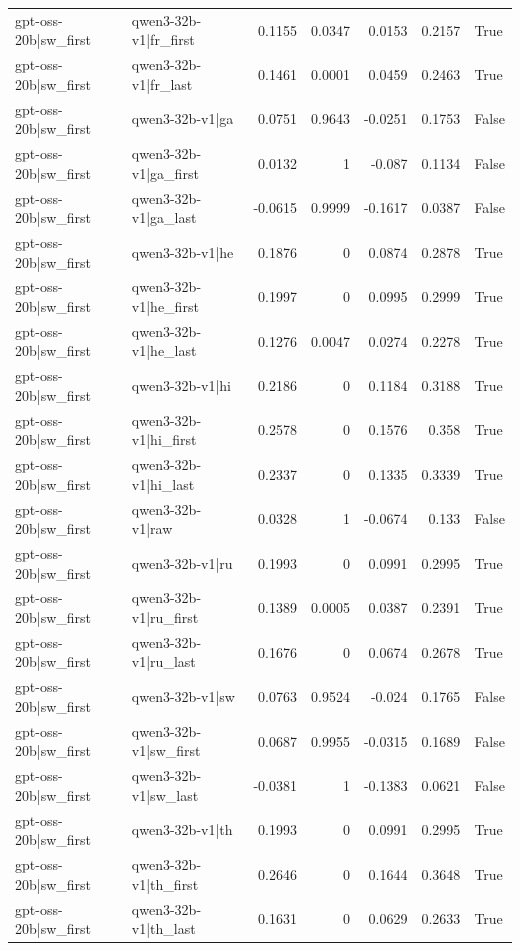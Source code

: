 \begin{table}
\begin{tabular}{l l r r r r l}
gpt-oss-20b|sw_first & qwen3-32b-v1|fr_first & 0.1155 & 0.0347 & 0.0153 & 0.2157 & True \\
gpt-oss-20b|sw_first & qwen3-32b-v1|fr_last & 0.1461 & 0.0001 & 0.0459 & 0.2463 & True \\
gpt-oss-20b|sw_first & qwen3-32b-v1|ga & 0.0751 & 0.9643 & -0.0251 & 0.1753 & False \\
gpt-oss-20b|sw_first & qwen3-32b-v1|ga_first & 0.0132 & 1 & -0.087 & 0.1134 & False \\
gpt-oss-20b|sw_first & qwen3-32b-v1|ga_last & -0.0615 & 0.9999 & -0.1617 & 0.0387 & False \\
gpt-oss-20b|sw_first & qwen3-32b-v1|he & 0.1876 & 0 & 0.0874 & 0.2878 & True \\
gpt-oss-20b|sw_first & qwen3-32b-v1|he_first & 0.1997 & 0 & 0.0995 & 0.2999 & True \\
gpt-oss-20b|sw_first & qwen3-32b-v1|he_last & 0.1276 & 0.0047 & 0.0274 & 0.2278 & True \\
gpt-oss-20b|sw_first & qwen3-32b-v1|hi & 0.2186 & 0 & 0.1184 & 0.3188 & True \\
gpt-oss-20b|sw_first & qwen3-32b-v1|hi_first & 0.2578 & 0 & 0.1576 & 0.358 & True \\
gpt-oss-20b|sw_first & qwen3-32b-v1|hi_last & 0.2337 & 0 & 0.1335 & 0.3339 & True \\
gpt-oss-20b|sw_first & qwen3-32b-v1|raw & 0.0328 & 1 & -0.0674 & 0.133 & False \\
gpt-oss-20b|sw_first & qwen3-32b-v1|ru & 0.1993 & 0 & 0.0991 & 0.2995 & True \\
gpt-oss-20b|sw_first & qwen3-32b-v1|ru_first & 0.1389 & 0.0005 & 0.0387 & 0.2391 & True \\
gpt-oss-20b|sw_first & qwen3-32b-v1|ru_last & 0.1676 & 0 & 0.0674 & 0.2678 & True \\
gpt-oss-20b|sw_first & qwen3-32b-v1|sw & 0.0763 & 0.9524 & -0.024 & 0.1765 & False \\
gpt-oss-20b|sw_first & qwen3-32b-v1|sw_first & 0.0687 & 0.9955 & -0.0315 & 0.1689 & False \\
gpt-oss-20b|sw_first & qwen3-32b-v1|sw_last & -0.0381 & 1 & -0.1383 & 0.0621 & False \\
gpt-oss-20b|sw_first & qwen3-32b-v1|th & 0.1993 & 0 & 0.0991 & 0.2995 & True \\
gpt-oss-20b|sw_first & qwen3-32b-v1|th_first & 0.2646 & 0 & 0.1644 & 0.3648 & True \\
gpt-oss-20b|sw_first & qwen3-32b-v1|th_last & 0.1631 & 0 & 0.0629 & 0.2633 & True \\

\end{tabular}
\end{table}
